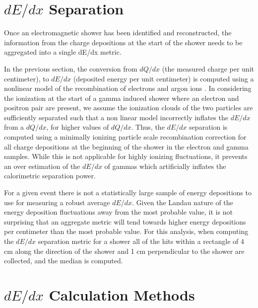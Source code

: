 \section{\label{sec:dedx_sep} $dE/dx$ Separation}


Once an electromagnetic shower has been identified and reconstructed, the information from the charge depositions at the start of the shower needs to be aggregated into a single dE/dx metric. 

In the previous section, the conversion from $dQ/dx$ (the measured charge per unit centimeter), to $dE/dx$ (deposited energy per unit centimeter) is computed using a nonlinear model of the recombination of electrons and argon ions \cite{Birks, Acciarri:2013met}.  In considering the ionization at the start of a gamma induced shower where an electron and positron pair are present, we assume the ionization clouds of the two particles are sufficiently separated such that a non linear model incorrectly inflates the $dE/dx$ from a $dQ/dx$, for higher values of $dQ/dx$.  Thus, the $dE/dx$ separation is computed using a minimally ionizing particle scale recombination correction for all charge depositions at the beginning of the shower in the electron and gamma samples.  While this is not applicable for highly ionizing fluctuations, it prevents an over estimation of the $dE/dx$ of gammas which artificially inflates the calorimetric separation power. 

For a given event there is not a statistically large sample of energy depositions to use for measuring a robust average $dE/dx$.  Given the Landau nature of the energy deposition fluctuations away from the most probable value, it is not surprising that an aggregate metric will tend towards higher energy depositions per centimeter than the most probable value.   For this analysis, when computing the $dE/dx$ separation metric for a shower all of the hits within a rectangle of 4 cm along the direction of the shower and 1 cm perpendicular to the shower are collected, and the median is computed.

\section{\label{sec:dedx_calcs} $dE/dx$ Calculation Methods}

